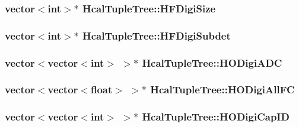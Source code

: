 \subsubsection[{H\+F\+Digi\+Size}]{\setlength{\rightskip}{0pt plus 5cm}vector$<$int$>$$\ast$ Hcal\+Tuple\+Tree\+::\+H\+F\+Digi\+Size}\label{class_hcal_tuple_tree_a49bb2b44d538e77e9d13793881c53d97}
\hypertarget{class_hcal_tuple_tree_a7e6e32f123dcbd48805db8f63c17698e}{}
\subsubsection[{H\+F\+Digi\+Subdet}]{\setlength{\rightskip}{0pt plus 5cm}vector$<$int$>$$\ast$ Hcal\+Tuple\+Tree\+::\+H\+F\+Digi\+Subdet}\label{class_hcal_tuple_tree_a7e6e32f123dcbd48805db8f63c17698e}
\hypertarget{class_hcal_tuple_tree_a66f1270b14c4fcf3c3c2152414aa867d}{}
\subsubsection[{H\+O\+Digi\+A\+D\+C}]{\setlength{\rightskip}{0pt plus 5cm}vector$<$vector$<$int$>$ $>$$\ast$ Hcal\+Tuple\+Tree\+::\+H\+O\+Digi\+A\+D\+C}\label{class_hcal_tuple_tree_a66f1270b14c4fcf3c3c2152414aa867d}
\hypertarget{class_hcal_tuple_tree_afe37a056626eef4c965a339b420171a9}{}
\subsubsection[{H\+O\+Digi\+All\+F\+C}]{\setlength{\rightskip}{0pt plus 5cm}vector$<$vector$<$float$>$ $>$$\ast$ Hcal\+Tuple\+Tree\+::\+H\+O\+Digi\+All\+F\+C}\label{class_hcal_tuple_tree_afe37a056626eef4c965a339b420171a9}
\hypertarget{class_hcal_tuple_tree_a81df879ffcc93b380edb13aaea8eb689}{}
\subsubsection[{H\+O\+Digi\+Cap\+I\+D}]{\setlength{\rightskip}{0pt plus 5cm}vector$<$vector$<$int$>$ $>$$\ast$ Hcal\+Tuple\+Tree\+::\+H\+O\+Digi\+Cap\+I\+D}\label{class_hcal_tuple_tree_a81df879ffcc93b380edb13aaea8eb689}
\hypertarget{class_hcal_tuple_tree_a0de64b4e4a03a43dd7bd54afe6b91121}{}
